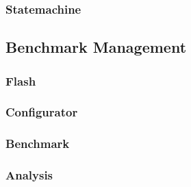 \subsubsection{Statemachine}\label{subsubsec:Statemachine}



\subsection{Benchmark Management}\label{subsec:Benchmark Management}

\subsubsection{Flash}\label{subsubsec:Flash}

\subsubsection{Configurator}\label{subsubsec:Configurator}

\subsubsection{Benchmark}\label{subsubsec:Benchmark}

\subsubsection{Analysis}\label{subsubsec:Analysis}

